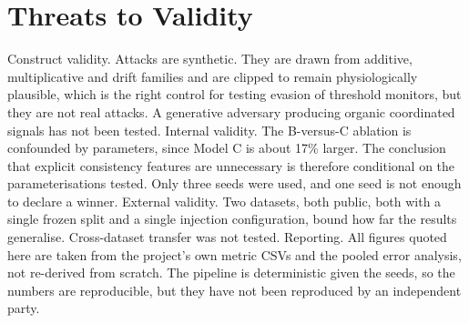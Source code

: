 \documentclass[conference]{IEEEtran}
\begin{document}
\section{Threats to Validity}
Construct validity. Attacks are synthetic. They are drawn from additive, multiplicative and drift families and are clipped to remain physiologically plausible, which is the right control for testing evasion of threshold monitors, but they are not real attacks. A generative adversary producing organic coordinated signals has not been tested.
Internal validity. The B-versus-C ablation is confounded by parameters, since Model C is about 17\% larger. The conclusion that explicit consistency features are unnecessary is therefore conditional on the parameterisations tested. Only three seeds were used, and one seed is not enough to declare a winner.
External validity. Two datasets, both public, both with a single frozen split and a single injection configuration, bound how far the results generalise. Cross-dataset transfer was not tested.
Reporting. All figures quoted here are taken from the project's own metric CSVs and the pooled error analysis, not re-derived from scratch. The pipeline is deterministic given the seeds, so the numbers are reproducible, but they have not been reproduced by an independent party.
\end{document}
